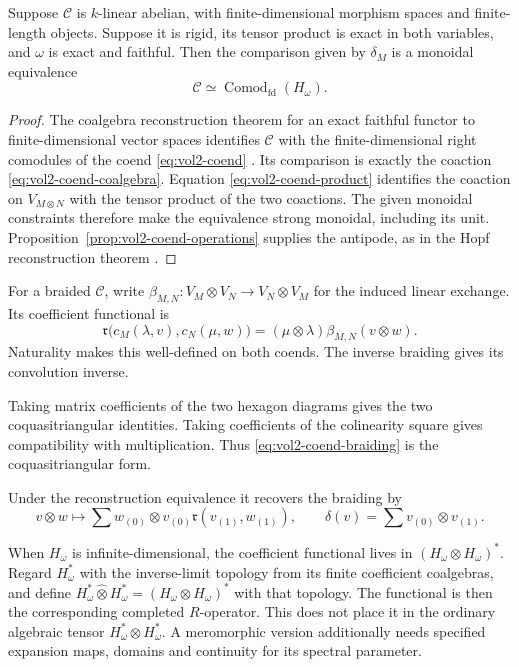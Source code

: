 \begin{theorem}\label{thm:vol2-tensor-reconstruction}
Suppose $\mathcal C$ is $k$-linear abelian, with
finite-dimensional morphism spaces and finite-length objects.
Suppose it is rigid, its tensor product is exact in both variables,
and $\omega$ is exact and faithful.
Then the comparison given by $\delta_M$ is a monoidal equivalence
\[
 \mathcal C\simeq
       \operatorname{Comod}_{\mathrm{fd}}(H_\omega).
\]
\end{theorem}
\begin{proof}
The coalgebra reconstruction theorem for an exact faithful functor
to finite-dimensional vector spaces identifies $\mathcal C$ with
the finite-dimensional right comodules of the coend
\eqref{eq:vol2-coend}
\cite[Theorem~1.10.1]{EGNO2015}.
Its comparison is exactly the coaction
\eqref{eq:vol2-coend-coalgebra}.
Equation \eqref{eq:vol2-coend-product} identifies the coaction
on $V_{M\otimes N}$ with the tensor product of the two coactions.
The given monoidal constraints therefore make the equivalence
strong monoidal, including its unit.
Proposition~\ref{prop:vol2-coend-operations} supplies the antipode,
as in the Hopf reconstruction theorem
\cite[Theorem~5.4.1]{EGNO2015}.
\end{proof}

For a braided $\mathcal C$, write
$\beta_{M,N}:V_M\otimes V_N\to V_N\otimes V_M$ for the induced
linear exchange.
Its coefficient functional is
\begin{equation}\label{eq:vol2-coend-braiding}
 \mathfrak r\bigl(c_M(\lambda,v),c_N(\mu,w)\bigr)
   =(\mu\otimes\lambda)\beta_{M,N}(v\otimes w).
\end{equation}
Naturality makes this well-defined on both coends.
The inverse braiding gives its convolution inverse.

Taking matrix coefficients of the two hexagon diagrams gives the
two coquasitriangular identities. Taking coefficients of the
colinearity square gives compatibility with multiplication.
Thus \eqref{eq:vol2-coend-braiding} is the coquasitriangular form.

Under the reconstruction equivalence it recovers the braiding by
\[
 v\otimes w\longmapsto
    \sum w_{(0)}\otimes v_{(0)}
      \mathfrak r(v_{(1)},w_{(1)}),
 \qquad
 \delta(v)=\sum v_{(0)}\otimes v_{(1)}.
\]

When $H_\omega$ is infinite-dimensional, the coefficient functional
lives in $(H_\omega\otimes H_\omega)^*$.
Regard $H_\omega^*$ with the inverse-limit topology from its finite
coefficient coalgebras, and define
$H_\omega^*\widehat\otimes H_\omega^*
=(H_\omega\otimes H_\omega)^*$ with that topology.
The functional is then the corresponding completed $R$-operator.
This does not place it in the ordinary algebraic tensor
$H_\omega^*\otimes H_\omega^*$.
A meromorphic version additionally needs specified expansion maps,
domains and continuity for its spectral parameter.

